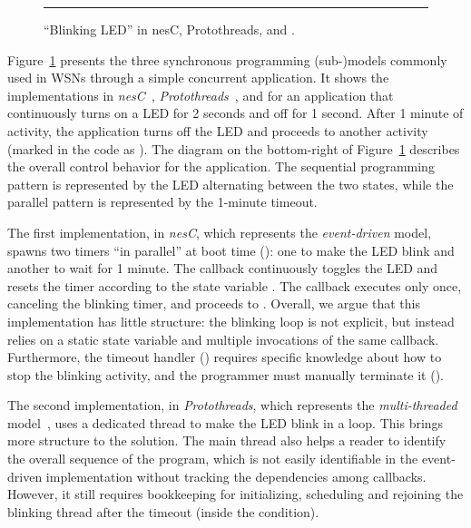 \begin{figure}[!t]
\begin{minipage}[t]{0.50\linewidth}
\end{minipage}
\rule{14cm}{0.37pt}
\caption{ ``Blinking LED'' in
    nesC,
    Protothreads,
    and \CEU. %
\label{lst.all}
}
\end{figure}

Figure~\ref{lst.all} presents the three synchronous programming (sub-)models 
commonly used in WSNs through a simple concurrent application.
It shows the implementations in \emph{nesC}~\cite{wsn.nesc}, 
\emph{Protothreads}~\cite{wsn.protothreads}, and \CEU for an application that 
continuously turns on a LED for 2 seconds and off for 1 second.
After 1 minute of activity, the application turns off the LED and proceeds to 
another activity (marked in the code as ).
The diagram on the bottom-right of Figure~\ref{lst.all} describes the overall 
control behavior for the application.
The sequential programming pattern is represented by the LED alternating between 
the two states, while the parallel pattern is represented by the 1-minute 
timeout.

The first implementation, in \emph{nesC}, which represents the 
\emph{event-driven} model, spawns two timers ``in parallel'' at boot time 
(): one to make the LED blink and another to wait for 1 
minute.
The callback  continuously toggles the LED and resets the timer 
according to the state variable .
The callback  executes only once, canceling the blinking timer, 
and proceeds to .
Overall, we argue that this implementation has little structure: the blinking 
loop is not explicit, but instead relies on a static state variable and 
multiple invocations of the same callback.
Furthermore, the timeout handler () requires specific knowledge 
about how to stop the blinking activity, and the programmer must manually 
terminate it ().

The second implementation, in \emph{Protothreads}, which represents the 
\emph{multi-threaded} model~\cite{wsn.protothreads,wsn.mantisos}, uses a 
dedicated thread to make the LED blink in a loop.
This brings more structure to the solution.
The main thread also helps a reader to identify the overall sequence of the 
program, which is not easily identifiable in the event-driven implementation 
without tracking the dependencies among callbacks.
However, it still requires bookkeeping for initializing, scheduling and 
rejoining the blinking thread after the timeout (inside the  
condition).

